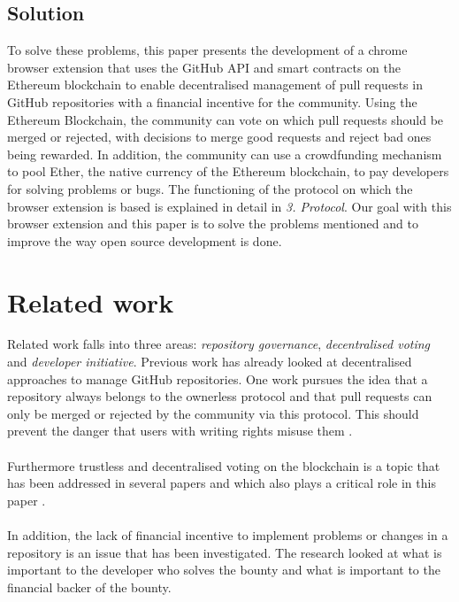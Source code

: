 \documentclass[sigconf]{acmart}
\begin{document}
\subsection{Solution}
To solve these problems, this paper presents the development of a chrome browser extension that uses the GitHub API  \cite{git2021api} and 
smart contracts \cite{eth2021contracts} on the Ethereum blockchain \cite{eth2021doc} to enable decentralised management of pull requests in GitHub repositories with a 
financial incentive for the community. Using the Ethereum Blockchain, the community can vote on which pull requests should be 
merged or rejected, with decisions to merge good requests and reject bad ones being rewarded. In addition, the community can 
use a crowdfunding mechanism to pool Ether, the native currency of the Ethereum blockchain, to pay developers for solving problems 
or bugs. The functioning of the protocol on which the browser extension is based is explained in detail in \textit{3. Protocol}. Our goal with
 this browser extension and this paper is to solve the problems mentioned and to improve the way open source development 
is done.

\section{Related work}
Related work falls into three areas: \textit{repository governance}, \textit{decentralised voting} and \textit{developer initiative}. 
Previous work has already looked at decentralised approaches to manage GitHub repositories. One work pursues the idea that 
a repository always belongs to the ownerless protocol and that pull requests can only be merged or rejected by the community 
via this protocol. This should prevent the danger that users with writing rights misuse them \cite{ulrich2020dev}. \\ \\
Furthermore trustless and decentralised voting on the blockchain is a topic that has been addressed in several papers 
and which also plays a critical role in this paper \cite{khoury2018decentralized, ulrich2020dev}. \\ \\
In addition, the lack of financial incentive to implement problems or changes in a repository is an issue that has been investigated. 
The research looked at what is important to the developer who solves the bounty and what is important to the financial backer of 
the bounty. \cite{zhou2019bounties}
\end{document}
